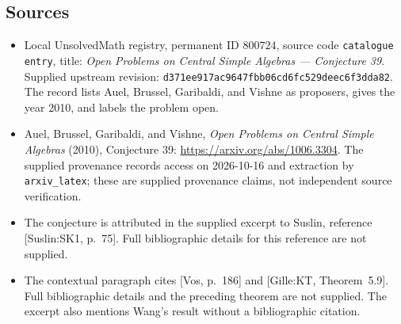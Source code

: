 \documentclass[11pt]{article}
\begin{document}
\subsection{Sources}
\begin{itemize}
\item Local UnsolvedMath registry, permanent ID \(800724\), source code \texttt{catalogue entry}, title: \emph{Open Problems on Central Simple Algebras --- Conjecture 39}. Supplied upstream revision: \texttt{d371ee917ac9647fbb06cd6fc529deec6f3dda82}. The record lists Auel, Brussel, Garibaldi, and Vishne as proposers, gives the year 2010, and labels the problem open.
\item Auel, Brussel, Garibaldi, and Vishne, \emph{Open Problems on Central Simple Algebras} (2010), Conjecture 39: \url{https://arxiv.org/abs/1006.3304}. The supplied provenance records access on 2026-10-16 and extraction by \texttt{arxiv\_latex}; these are supplied provenance claims, not independent source verification.
\item The conjecture is attributed in the supplied excerpt to Suslin, reference [Suslin:SK1, p.~75]. Full bibliographic details for this reference are not supplied.
\item The contextual paragraph cites [Vos, p.~186] and [Gille:KT, Theorem~5.9]. Full bibliographic details and the preceding theorem are not supplied. The excerpt also mentions Wang's result without a bibliographic citation.
\end{itemize}
\end{document}
